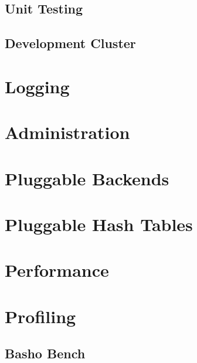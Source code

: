 \subsection{Unit Testing}

\subsection{Development Cluster}

\section{Logging}

\section{Administration}

\section{Pluggable Backends}

\section{Pluggable Hash Tables}

\section{Performance}

\section{Profiling}

\subsection{Basho Bench}



